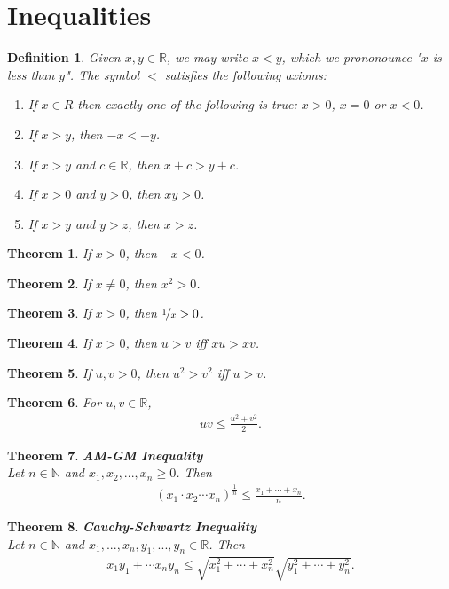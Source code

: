 \documentclass{article}
\theoremstyle{sltheorem}
\newtheorem{definition}{Definition}[section]
\newtheorem{theorem}{Theorem}[section]
\newcommand{\R}{\mathbb{R}}
\newcommand{\N}{\mathbb{N}}
\newcommand*\B[1]{\textbf{#1}}
\begin{document}
\section{Inequalities}
\begin{definition}
    Given $x, y \in \R$, we may write $x<y$, which we prononounce "$x$ is less than $y$". The symbol $<$ satisfies the following axioms:
    \begin{enumerate}
        \item If $x\in R$ then exactly one of the following is true: $x>0$, $x=0$ or $x<0$.
        \item If $x>y$, then $-x<-y$.
        \item If $x>y$ and $c\in\R$, then $x+c > y+c$.
        \item If $x > 0$ and $y > 0$, then $xy > 0$.
        \item If $x>y$ and $y>z$, then $x>z$.
    \end{enumerate}
\end{definition}
\begin{theorem}
    If $x>0$, then $-x<0$.
\end{theorem}
\begin{theorem}
    If $x\not=0$, then $x^2 > 0$.
\end{theorem}
\begin{theorem}
    If $x>0$, then $\nicefrac{1}{x}>0$.
\end{theorem}
\begin{theorem}
    If $x>0$, then $u>v$ iff $xu>xv$.
\end{theorem}
\begin{theorem}
    If $u,v>0$, then $u^2>v^2$ iff $u>v$.
\end{theorem}
\begin{theorem}
    For $u,v\in\R$,
    \begin{align*}
        uv\leq \frac{u^2+v^2}{2}.
    \end{align*}
\end{theorem}
\begin{theorem}
    \B{AM-GM Inequality}\\
    Let $n\in\N$ and $x_1, x_2, ..., x_n \geq 0$. Then 
    \begin{align*}
        (x_1\cdot x_2\cdots x_n)^{\frac{1}{n}}\leq\frac{x_1+\cdots+x_n}{n}.
    \end{align*}
\end{theorem}
\begin{theorem}
    \B{Cauchy-Schwartz Inequality}\\
    Let $n\in\N$ and $x_1,...,x_n,y_1,...,y_n\in\R$. Then
    \begin{align*}
        x_1y_1+\cdots x_ny_n \leq \sqrt{x_1^2+\cdots+x_n^2}\sqrt{y_1^2+\cdots+y_n^2}.
    \end{align*}
\end{theorem}
\end{document}
